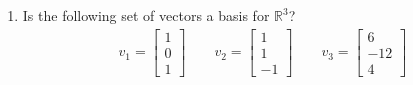 \documentclass[10pt, a4paper]{article}
\theoremstyle{break}
\begin{document}
\begin{enumerate}
\item Is the following set of vectors a basis for $\mathbb{R}^3$?
\begin{align}
v_1=\begin{bmatrix} 1 \\ 0 \\1 \end{bmatrix} \qquad v_2=\begin{bmatrix} 1 \\ 1 \\ -1 \end{bmatrix} \qquad v_3=\begin{bmatrix} 6 \\ -12\\ 4 \end{bmatrix}
\end{align}

\end{enumerate}
\end{document}
